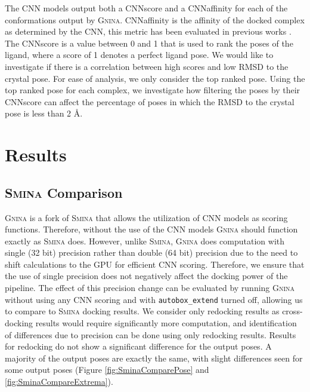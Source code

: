 \documentclass[journal=jcisd8,manuscript=article]{achemso}
\begin{document}
The CNN models output both a CNNscore and a CNNaffinity for each of the conformations output by \textsc{Gnina}. CNNaffinity is the affinity of the docked complex as determined by the CNN, this metric has been evaluated in previous works \cite{francoeur2020three}. The CNNscore is a value between 0 and 1 that is used to rank the poses of the ligand, where a score of 1 denotes a perfect ligand pose. We would like to investigate if there is a correlation between high scores and low RMSD to the crystal pose. For ease of analysis, we only consider the top ranked pose. Using the top ranked pose for each complex, we investigate how filtering the poses by their CNNscore can affect the percentage of poses in which the RMSD to the crystal pose is less than 2 \AA.

\section{Results}
\subsection{{\normalfont\scshape Smina} Comparison}
\textsc{Gnina} is a fork of \textsc{Smina} that allows the utilization of CNN models as scoring functions. Therefore, without the use of the CNN models \textsc{Gnina} should function exactly as \textsc{Smina} does. However, unlike \textsc{Smina}, \textsc{Gnina} does computation with single (32 bit) precision rather than double (64 bit) precision due to the need to shift calculations to the GPU for efficient CNN scoring. Therefore, we ensure that the use of single precision does not negatively affect the docking power of the pipeline. The effect of this precision change can be evaluated by running \textsc{Gnina} without using any CNN scoring and with \texttt{autobox\_extend} turned off, allowing us to compare to \textsc{Smina} docking results. We consider only redocking results as cross-docking results would require significantly more computation, and identification of differences due to precision can be done using only redocking results. Results for redocking do not show a significant difference for the output poses. A majority of the output poses are exactly the same, with slight differences seen for some output poses (Figure \ref{fig:SminaComparePose} and \ref{fig:SminaCompareExtrema}).
\end{document}
